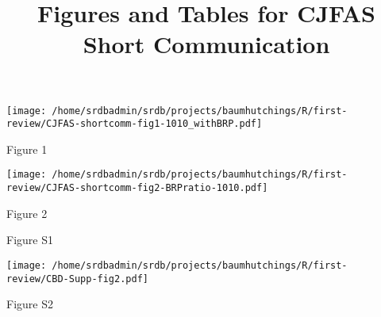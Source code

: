 \documentclass[letterpaper,12pt]{article}
\title{Figures and Tables for CJFAS Short Communication}
\begin{document}
\maketitle{}

\begin{center}
\texttt{[image: /home/srdbadmin/srdb/projects/baumhutchings/R/first-review/CJFAS-shortcomm-fig1-1010\_withBRP.pdf]}
\end{center}
\noindent 
Figure 1

\begin{center}
\texttt{[image: /home/srdbadmin/srdb/projects/baumhutchings/R/first-review/CJFAS-shortcomm-fig2-BRPratio-1010.pdf]}
\end{center}
\noindent 
Figure 2


\begin{tiny}
\begin{landscape}

\end{landscape}
\end{tiny}

\clearpage


\noindent 
Figure S1

\clearpage

\begin{center}
\texttt{[image: /home/srdbadmin/srdb/projects/baumhutchings/R/first-review/CBD-Supp-fig2.pdf]}
\end{center}
\noindent 
Figure S2
\end{document}
